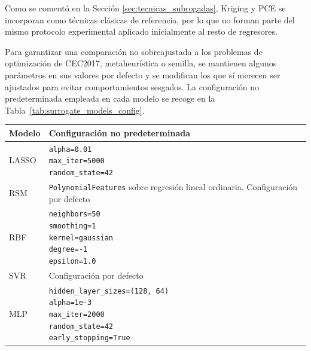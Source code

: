 Como se comentó en la Sección \ref{sec:tecnicas_subrogadas}, Kriging y
PCE se incorporan como técnicas clásicas de referencia, por lo que no forman
parte del mismo protocolo experimental aplicado inicialmente al resto de
regresores.

Para garantizar una comparación no sobreajustada a los problemas de optimización de CEC2017, metaheurística o semilla, se mantienen algunos parámetros en sus valores por defecto y se modifican los que sí merecen ser ajustados para evitar comportamientos sesgados. La configuración no predeterminada empleada en cada modelo se recoge en la Tabla~\ref{tab:surrogate_models_config}.


\begin{table}[htbp]
    \centering
    \begin{tabular}{l p{7cm}}
        \toprule
        \textbf{Modelo} & \textbf{Configuración no predeterminada}                                                \\
        \midrule
        LASSO           & \makecell[l]{\texttt{alpha=0.01}                                                        \\ \texttt{max\_iter=5000} \\ \texttt{random\_state=42}} \\
        \midrule
        RSM             & \texttt{PolynomialFeatures} sobre regresión lineal ordinaria. Configuración por defecto \\
        \midrule
        RBF             & \makecell[l]{\texttt{neighbors=50}                                                      \\ \texttt{smoothing=1} \\ \texttt{kernel=gaussian} \\ \texttt{degree=-1} \\ \texttt{epsilon=1.0}} \\
        \midrule
        SVR             & Configuración por defecto                                                               \\
        \midrule
        MLP             & \makecell[l]{\texttt{hidden\_layer\_sizes=(128,\,64)}                                   \\ \texttt{alpha=1e-3} \\ \texttt{max\_iter=2000} \\ \texttt{random\_state=42} \\ \texttt{early\_stopping=True}} \\

\end{tabular}
\end{table}
